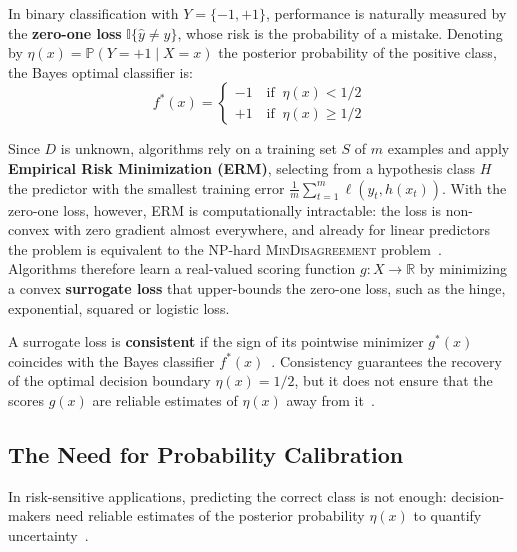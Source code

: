 \documentclass[a4paper, 10pt]{article}
\begin{document}
In binary classification with $Y = \{-1, +1\}$, performance is naturally measured by the \textbf{zero-one loss} $\mathbb{I}\{\hat{y} \neq y\}$, whose risk is the probability of a mistake. Denoting by $\eta(x) = \mathbb{P}(Y = +1 \mid X = x)$ the posterior probability of the positive class, the Bayes optimal classifier is:
\begin{equation}
  f^*(x) = \begin{cases}
    -1 \ \ \  \text{ if } \  \eta(x) < 1/2 \\
    +1 \ \ \  \text{ if } \ \eta(x) \ge 1/2
  \end{cases} 
\end{equation}
 
Since $D$ is unknown, algorithms rely on a training set $S$ of $m$ examples and apply \textbf{Empirical Risk Minimization (ERM)}, selecting from a hypothesis class $H$ the predictor with the smallest training error $\frac{1}{m}\sum_{t=1}^m \ell(y_t, h(x_t))$. With the zero-one loss, however, ERM is computationally intractable: the loss is non-convex with zero gradient almost everywhere, and already for linear predictors the problem is equivalent to the NP-hard \textsc{MinDisagreement} problem~\cite{cesabianchi2026notes}. Algorithms therefore learn a real-valued scoring function $g : X \to \mathbb{R}$ by minimizing a convex \textbf{surrogate loss} that upper-bounds the zero-one loss, such as the hinge, exponential, squared or logistic loss. 

A surrogate loss is \textbf{consistent} if the sign of its pointwise minimizer $g^*(x)$ coincides with the Bayes classifier $f^*(x)$~\cite{cesabianchi2026notes}. Consistency guarantees the recovery of the optimal decision boundary $\eta(x) = 1/2$, but it does not ensure that the scores $g(x)$ are reliable estimates of $\eta(x)$ away from it~\cite{niculescu2005predicting, cesabianchi2026notes}.

\subsection{The Need for Probability Calibration}\label{sec:need}
In risk-sensitive applications, predicting the correct class is not enough: decision-makers need reliable estimates of the posterior probability $\eta(x)$ to quantify uncertainty~\cite{niculescu2005predicting}. 
\end{document}
